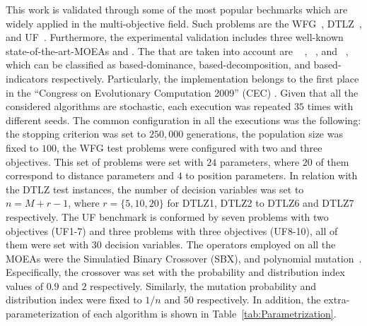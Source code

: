 This work is validated through some of the most popular bechmarks which are widely applied in the multi-objective field.
%
Such problems are the WFG~\cite{Joel:WFG}, DTLZ~\cite{Joel:DTLZ}, and UF~\cite{Joel:CEC2009}.
%
Furthermore, the experimental validation includes three well-known state-of-the-art-MOEAs and \VSDMOEA{}.
%
The \MOEAS{} that are taken into account are \NSGAII{}~\cite{Joel:jMetal} , \MOEAD{}~\cite{MOEADCode}, and \RMOEA{}~\cite{R2EMOACode}, which can be classified as based-dominance, based-decomposition, and based-indicators respectively.
%
Particularly, the \MOEAD{} implementation belongs to the first place in the ``Congress on Evolutionary Computation 2009'' (CEC) \cite{zhang2009performance}.
%
Given that all the considered algorithms are stochastic, each execution was repeated $35$ times with different seeds.
%
The common configuration in all the executions was the following: the stopping criterion was set to $250,000$ generations, the population size was fixed to $100$, the WFG test problems were configured with two and three objectives.
%
This set of problems were set with $24$ parameters, where $20$ of them correspond to distance parameters and $4$ to position parameters.
%
In relation with the DTLZ test instances, the number of decision variables was set to $n=M+r-1$, where $r=\{5, 10, 20\}$ for DTLZ1, DTLZ2 to DTLZ6 and DTLZ7 respectively.
% 
The UF benchmark is conformed by seven problems with two objectives (UF1-7) and three problems with three objectives (UF8-10), all of them were set with $30$ decision variables.
%
The operators employed on all the MOEAs were the Simulatied Binary Crossover (SBX), and polynomial mutation~\cite{Joel:SBX1994, Joel:Mutation}.
%
Especifically, the crossover was set with the probability and distribution index values of $0.9$ and $2$ respectively.
%
Similarly, the mutation probability and distribution index were fixed to $1/n$ and $50$ respectively.
%
%
%
%
%
In addition, the extra-parameterization of each algorithm is shown in Table~\ref{tab:Parametrization}.


